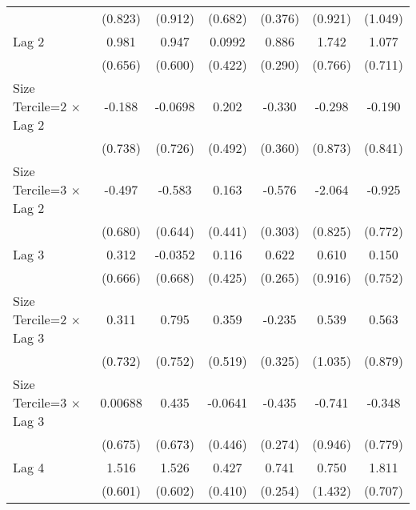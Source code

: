 \begin{table}[htbp]
\begin{tabular}{l*{6}{c}}
                &  (0.823)         &  (0.912)         &  (0.682)         &  (0.376)         &  (0.921)         &  (1.049)         \\
\addlinespace
Lag 2           &    0.981         &    0.947         &   0.0992         &    0.886\sym{**} &    1.742\sym{*}  &    1.077         \\
                &  (0.656)         &  (0.600)         &  (0.422)         &  (0.290)         &  (0.766)         &  (0.711)         \\
\addlinespace
Size Tercile=2 $\times$ Lag 2&   -0.188         &  -0.0698         &    0.202         &   -0.330         &   -0.298         &   -0.190         \\
                &  (0.738)         &  (0.726)         &  (0.492)         &  (0.360)         &  (0.873)         &  (0.841)         \\
\addlinespace
Size Tercile=3 $\times$ Lag 2&   -0.497         &   -0.583         &    0.163         &   -0.576         &   -2.064\sym{*}  &   -0.925         \\
                &  (0.680)         &  (0.644)         &  (0.441)         &  (0.303)         &  (0.825)         &  (0.772)         \\
\addlinespace
Lag 3           &    0.312         &  -0.0352         &    0.116         &    0.622\sym{*}  &    0.610         &    0.150         \\
                &  (0.666)         &  (0.668)         &  (0.425)         &  (0.265)         &  (0.916)         &  (0.752)         \\
\addlinespace
Size Tercile=2 $\times$ Lag 3&    0.311         &    0.795         &    0.359         &   -0.235         &    0.539         &    0.563         \\
                &  (0.732)         &  (0.752)         &  (0.519)         &  (0.325)         &  (1.035)         &  (0.879)         \\
\addlinespace
Size Tercile=3 $\times$ Lag 3&  0.00688         &    0.435         &  -0.0641         &   -0.435         &   -0.741         &   -0.348         \\
                &  (0.675)         &  (0.673)         &  (0.446)         &  (0.274)         &  (0.946)         &  (0.779)         \\
\addlinespace
Lag 4           &    1.516\sym{*}  &    1.526\sym{*}  &    0.427         &    0.741\sym{**} &    0.750         &    1.811\sym{*}  \\
                &  (0.601)         &  (0.602)         &  (0.410)         &  (0.254)         &  (1.432)         &  (0.707)         \\

\end{tabular}
\end{table}
